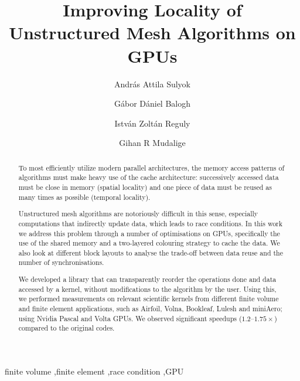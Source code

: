 \documentclass[number]{elsarticle}
\begin{document}
\begin{frontmatter}

  \title{Improving Locality of Unstructured Mesh Algorithms on GPUs}

  \author[1,2]{András Attila Sulyok}
  \author[1,2]{Gábor Dániel Balogh}
  \author[1]{István Zoltán Reguly}
  \author[3]{Gihan R Mudalige}
  \address[1]{
    Faculty of Information Technology and Bionics,
    Pázmány Péter Catholic University,
    Budapest, Hungary
  }
  \address[2]{
    3in-PPCU Research Group,
    Pázmány Péter Catholic University,
    Esztergom, Hungary
  }
   \address[3]{
    Department of Computer Science,
    University of Warwick,
    Coventry, United Kingdom
  }

  \begin{abstract}
    To most efficiently utilize modern parallel architectures, the memory access
    patterns of algorithms must make heavy use of the cache architecture:
    successively accessed data must be close in memory (spatial locality) and
    one piece of data must be reused as many times as possible (temporal
    locality).

    Unstructured mesh algorithms are notoriously difficult in this sense,
    especially computations that indirectly update data, which leads to race
    conditions. In this work we address this problem through a number of
    optimisations on GPUs, specifically the use of the shared memory and a
    two-layered colouring strategy to cache the data. We also look at different
    block layouts to analyse the trade-off between data reuse and the number of
    synchronisations.

    We developed a library that can transparently reorder the
    operations done and data accessed by a kernel, without modifications to the
    algorithm by the user. Using this, we performed measurements on relevant
    scientific kernels from different finite volume and finite element applications, such as Airfoil, Volna,
    Bookleaf, Lulesh and miniAero; using Nvidia Pascal and Volta GPUs. We
    observed significant speedups ($1.2\text{--}1.75\times$) compared to the
    original codes.
  \end{abstract}

  \begin{keyword}
    finite volume \sep finite element \sep race condition \sep GPU
  \end{keyword}

\end{frontmatter}
\end{document}
